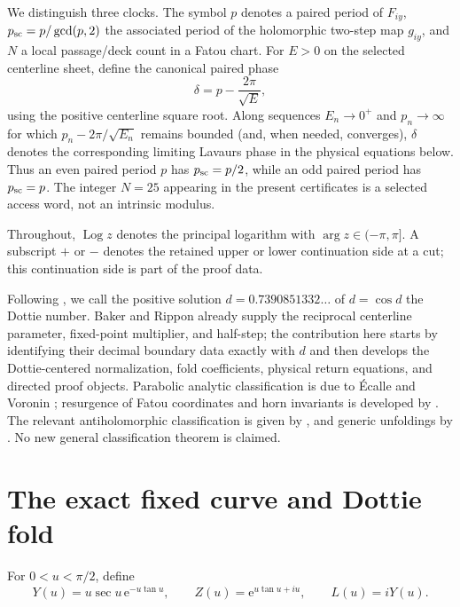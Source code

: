 \documentclass[11pt]{article}
\theoremstyle{definition}
\theoremstyle{remark}
\newcommand{\e}{\mathrm e}
\newcommand{\Logp}{\operatorname{Log}}
\begin{document}
We distinguish three clocks.  The symbol $p$ denotes a paired period of $F_{iy}$, $p_{\rm sc}=p/\gcd(p,2)$ the associated period of the holomorphic two-step map $g_{iy}$, and $N$ a local passage/deck count in a Fatou chart.  For $E>0$ on the selected centerline sheet, define the canonical paired phase
\begin{equation}
  \delta=p-\frac{2\pi}{\sqrt E},
  \label{eq:delta-clock}
\end{equation}
using the positive centerline square root.  Along sequences $E_n\to0^+$ and $p_n\to\infty$ for which $p_n-2\pi/\sqrt{E_n}$ remains bounded (and, when needed, converges), $\delta$ denotes the corresponding limiting Lavaurs phase in the physical equations below.  Thus an even paired period $p$ has $p_{\rm sc}=p/2$, while an odd paired period has $p_{\rm sc}=p$.  The integer $N=25$ appearing in the present certificates is a selected access word, not an intrinsic modulus.

Throughout, $\Logp z$ denotes the principal logarithm with $\arg z\in(-\pi,\pi]$.  A subscript $+$ or $-$ denotes the retained upper or lower continuation side at a cut; this continuation side is part of the proof data.

Following \citet{Kaplan2007}, we call the positive solution $d=0.7390851332\ldots$ of $d=\cos d$ the Dottie number.  Baker and Rippon already supply the reciprocal centerline parameter, fixed-point multiplier, and half-step; the contribution here starts by identifying their decimal boundary data exactly with $d$ and then develops the Dottie-centered normalization, fold coefficients, physical return equations, and directed proof objects.  Parabolic analytic classification is due to Écalle and Voronin \citep{Ecalle1985,Voronin1981}; resurgence of Fatou coordinates and horn invariants is developed by \citet{DudkoSauzin2014,DudkoSauzin2015}.  The relevant antiholomorphic classification is given by \citet{GodinRousseau2022}, and generic unfoldings by \citet{MardesicRoussarieRousseau2004,ChristopherRousseau2014,GodinRousseau2023,Rousseau2026}.  No new general classification theorem is claimed.

\section{The exact fixed curve and Dottie fold}

For $0<u<\pi/2$, define
\begin{equation}
  Y(u)=u\sec u\,\e^{-u\tan u},\qquad
  Z(u)=\e^{u\tan u+iu},\qquad
  L(u)=iY(u).
  \label{eq:fixedcurve}
\end{equation}
\end{document}
